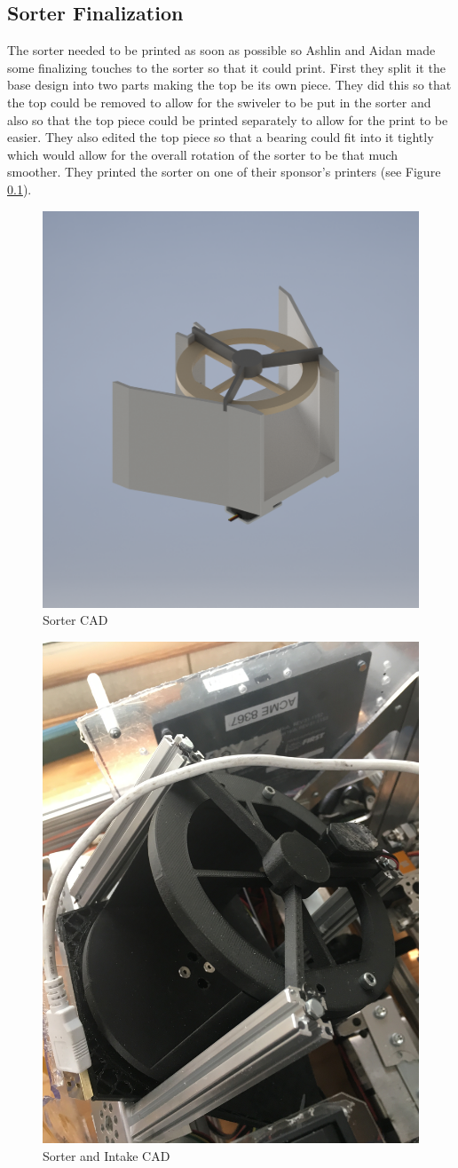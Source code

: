 \documentclass{article}
\newif\ifcontents
\begin{document}
\contentsfalse

 
\subsection{Sorter Finalization}
The sorter needed to be printed as soon as possible so Ashlin and Aidan made some finalizing touches to the sorter so that it could print. First they split it the base design into two parts making the top be its own piece. They did this so that the top could be removed to allow for the swiveler to be put in the sorter and also so that the top piece could be printed separately to allow for the print to be easier. They also edited the top piece so that a bearing could fit into it tightly which would allow for the overall rotation of the sorter to be that much smoother. They printed the sorter on one of their sponsor's printers (see Figure \ref{}).

\begin{figure}
    \centering
    \includegraphics[width=.6 \textwidth, ]{10_11-05/images/og_sorter[1].png}
    \caption{Sorter CAD}
    \label{fig:Sorter CAD}
\end{figure}

\begin{figure}
    \centering
    \includegraphics[width=.6 \textwidth, angle=270 ]{10_11-05/images/sorter.JPG}
    \caption{Sorter and Intake CAD}
    \label{fig:Intake CAD}
\end{figure}
\end{document}
